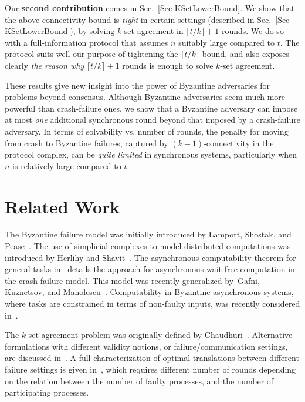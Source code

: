 \documentclass[11pt]{article}
\begin{document}
Our \textbf{second contribution} comes in Sec.~\ref{Sec-KSetLowerBound}.
We show that the above connectivity bound
is \emph{tight} in certain settings (described in Sec.~\ref{Sec-KSetLowerBound}),
by solving $k$-set agreement in $\lceil t/k \rceil + 1$ rounds.
We do so with a full-information protocol that assumes $n$ suitably large compared to $t$.
The protocol suits well our purpose of tightening the $\lceil t/k \rceil$ bound,
and also exposes clearly \emph{the reason why} $\lceil t/k \rceil + 1$ rounds is enough
to solve $k$-set agreement.

These results give new insight into the power of Byzantine
adversaries for problems beyond consensus.
Although Byzantine adversaries seem much more powerful than
crash-failure ones,
we show that a Byzantine adversary can impose at most \emph{one} additional
synchronous round beyond that imposed by a crash-failure adversary.
In terms of solvability vs. number of rounds,
the penalty for moving from crash to Byzantine failures,
captured by $(k - 1)$-connectivity in the protocol complex,
can be \emph{quite limited} in synchronous systems,
particularly when $n$ is relatively large compared to $t$.

\section{Related Work}
\label{Sec-RelatedWork}

The Byzantine failure model was initially introduced by Lamport,
Shostak, and Pease~\cite{Lamport1982}.
The use of simplicial complexes to model distributed computations
was introduced by Herlihy and Shavit~\cite{HerlihyShavit1993}.
The asynchronous computability theorem for general tasks in~\cite{HerlihyShavit1999}
details the approach for asynchronous wait-free computation in the
crash-failure model.
This model was recently generalized by~Gafni, Kuznetsov, and Manolescu~\cite{GACT2014}.
Computability in Byzantine asynchronous systems,
where tasks are constrained in terms of non-faulty inputs,
was recently considered in~\cite{MendesHerlihy14}.

The $k$-set agreement problem was originally defined by Chaudhuri~\cite{ksetagreement}.
Alternative formulations with
different validity notions, or failure/communication settings,
are discussed in~\cite{Neiger93,dePriscoMR2001}.
A full characterization of optimal translations between different failure settings
is given in~\cite{BazziNeiger01,NeigerToueg90},
which requires different number of rounds depending on the relation between
the number of faulty processes,
and the number of participating processes.
\end{document}
